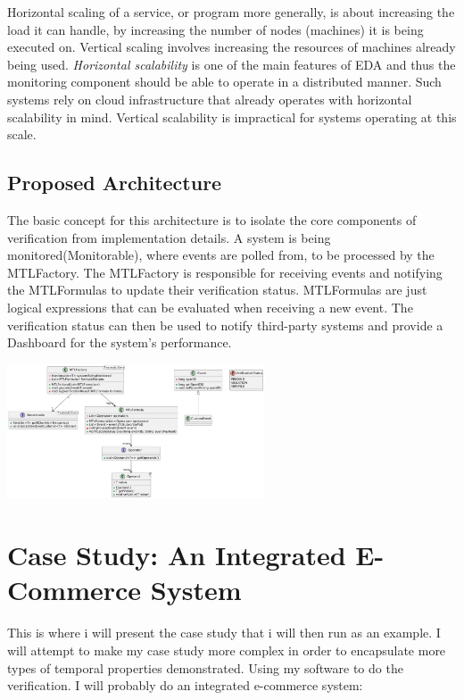 \documentclass[twocolumn]{article}
\begin{document}
\par
Horizontal scaling of a service, or program more generally, is about increasing the load it can handle,
by increasing the number of nodes (machines) it is being executed on.
Vertical scaling involves increasing the resources of machines already being used.
\emph{Horizontal scalability} is one of the main features of EDA and thus the monitoring component should be able to operate in a distributed manner. Such systems rely on cloud infrastructure that already operates with horizontal scalability in mind.
Vertical scalability is impractical for systems operating at this scale.
\subsection{Proposed Architecture}
The basic concept for this architecture is to isolate the core components of verification from implementation details.
A system is being monitored(Monitorable), where events are polled from, to be processed by the MTLFactory. The MTLFactory is responsible for receiving events and notifying the MTLFormulas to update their verification status. MTLFormulas are just logical expressions that can be evaluated when receiving a new event. The verification status can then be used to notify third-party systems and provide a Dashboard for the system's performance.

\includegraphics[width=3in]{uml-diagram.pdf}


\section{Case Study: An Integrated E-Commerce System}
This is where i will present the case study that i will then run as an example.
I will attempt to make my case study more complex in order to encapsulate more types of temporal properties demonstrated.
Using my software to do the verification. I will probably do an integrated e-commerce system:
\end{document}
